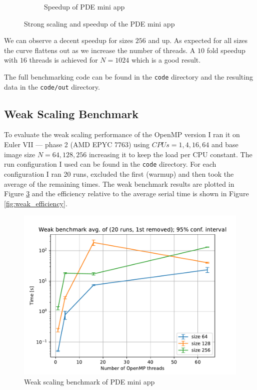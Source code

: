 \documentclass[unicode,11pt,a4paper,oneside,numbers=endperiod,openany]{scrartcl}
\begin{document}
\begin{figure}[h!t]
\begin{subfigure}{.5\textwidth}
        \caption{Speedup of PDE mini app}
        \label{fig:strong_speedup}
    \end{subfigure}
    \caption{Strong scaling and speedup of the PDE mini app}
\end{figure}

We can observe a decent speedup for sizes $256$ and up. As expected for all sizes the curve flattens out as we increase the number of threads. A $10$ fold speedup with $16$ threads is achieved for $N=1024$ which is a good result.

The full benchmarking code can be found in the \texttt{code} directory and the resulting data in the \texttt{code/out} directory.

\subsection{Weak Scaling Benchmark}

To evaluate the weak scaling performance of the OpenMP version I ran it on Euler VII — phase 2 (AMD EPYC 7763) using $CPUs=1, 4, 16, 64$ and base image size $N=64, 128, 256$ increasing it to keep the load per CPU constant. The run configuration I used can be found in the \texttt{code} directory. For each configuration I ran 20 runs, excluded the first (warmup) and then took the average of the remaining times. The weak benchmark results are plotted in Figure \ref{fig:weak_scaling} and the efficiency relative to the average serial time is shown in Figure \ref{fig:weak_efficiency}.

\begin{figure}[h!t]
    \includegraphics[width=\textwidth]{plots/weak_scaling.pdf}
    \caption{Weak scaling benchmark of PDE mini app}
    \label{fig:weak_scaling}
\end{figure}
\end{document}
